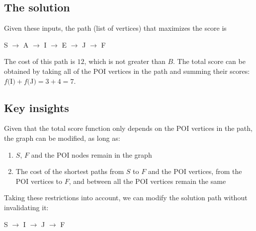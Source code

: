 \documentclass{article}
\begin{document}
\subsection{The solution}
Given these inputs, the path (list of vertices) that maximizes the score is
\begin{center}

S $\rightarrow$ A $\rightarrow$ I $\rightarrow$ E $\rightarrow$ J $\rightarrow$ F
\end{center}

The cost of this path is $12$, which is not greater than $B$. The total score can be obtained by taking all of the POI vertices in the path and summing their scores: $f($I$) + f($J$) = 3 + 4 = 7$.

\subsection{Key insights}
Given that the total score function only depends on the POI vertices in the path, the graph can be modified, as long as:
\begin{enumerate}
    \item $S$, $F$ and the POI nodes remain in the graph
    \item The cost of the shortest paths from $S$ to $F$ and the POI vertices, from the POI vertices to $F$, and between all the POI vertices remain the same
\end{enumerate}

Taking these restrictions into account, we can modify the solution path without invalidating it:
\begin{center}

S $\rightarrow$ I $\rightarrow$ J $\rightarrow$ F
\end{center}
\end{document}
